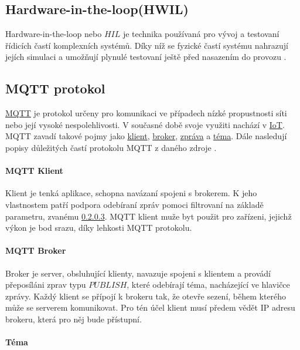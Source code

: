 \subsection{Hardware-in-the-loop(HWIL)}
\label{subsec:hwil}

Hardware-in-the-loop nebo $HIL$ je technika používaná pro vývoj a testovaní řídicích častí komplexních systémů. Díky níž se fyzické častí systému nahrazují jejích simulaci a umožňují plynulé testovaní ještě před nasazením do provozu \cite{hil}.

\subsection{MQTT protokol}
\label{subsec:mqtt-proto}

\href{http://mqtt.org/}{MQTT} je protokol určeny pro komunikaci ve případech nízké propustnosti síti nebo její vysoké nespolehlivosti. V současné době svoje využiti nachází v \href{https://en.wikipedia.org/wiki/Internet_of_things}{IoT}. MQTT zavadí takové pojmy jako \href{par:client}{klient}, \href{par:broker}{broker}, \href{par:message}{zpráva} a \href{par:topic}{téma}. Dále nasledují popisy důležitých častí protokolu MQTT z daného zdroje \cite{mqtt}.

\paragraph{MQTT Klient}
\label{par:client}

Klient je tenká aplikace, schopna navázaní spojeni s brokerem. K jeho vlastnostem patří podpora odebíraní zpráv pomoci filtrovaní na základě parametru, zvanému  \ref{par:topic}. MQTT klient muže byt použit pro zařízeni, jejichž výkon je bod srazu, díky lehkosti MQTT protokolu.

\paragraph{MQTT Broker}
\label{par:broker}

Broker je server, obsluhující klienty, navazuje spojeni s klientem a provádí přeposíláni zprav typu $PUBLISH$, které odebírají téma, nacházející ve hlavičce zprávy. Každý klient se přípojí k brokeru tak, že otevře sezení, během kterého může se serverem komunikovat. Pro tén účel klient musí předem vědět IP adresu brokeru, která pro něj bude přístupní.

\paragraph{Téma}
\label{par:topic}


